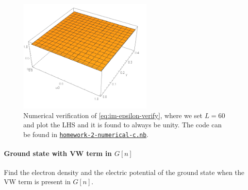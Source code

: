 \documentclass[hyperref, a4paper]{article}
\begin{document}
\begin{figure}
    \centering
    \includegraphics[width=0.6\textwidth]{sum-rule-im-epsilon.PNG}
    \caption{Numerical verification of \eqref{eq:im-epsilon-verify}, where we set $L=60$ and plot the LHS and it is found to always be unity. The code can be found in \href{./homework-2-numerical-c.nb}{\texttt{homework-2-numerical-c.nb}}.}
    \label{fig:im-epsilon-plot}
\end{figure}

\paragraph{}

\paragraph{Ground state with VW term in $G[n]$} Find the electron density and the electric potential of the ground state when the VW term is present in $G[n]$.
\end{document}
